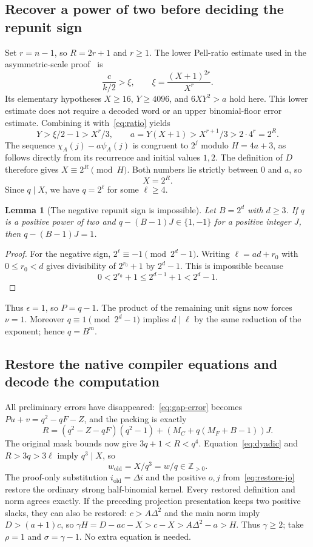 \documentclass[11pt]{article}
\newtheorem{lemma}[theorem]{Lemma}
\theoremstyle{definition}
\newcommand{\Pos}{\mathbb Z_{>0}}
\begin{document}
\subsection{Recover a power of two before deciding the repunit sign}

Set $r=n-1$, so $R=2r+1$ and $r\geq1$. The lower Pell-ratio estimate used
in the asymmetric-scale proof~\cite{Asymmetric} is
\[
 \frac{c}{k/2}>
 \xi,\qquad \xi=\frac{(X+1)^{2r}}{X^r}.
\]
Its elementary hypotheses $X\geq16$, $Y\geq4096$, and $6XY^2>a$ hold
here. This lower estimate does not require a decoded word or an upper
binomial-floor error estimate. Combining it with~\eqref{eq:ratio} yields
\[
 Y>\xi/2-1>X^r/3,
 \qquad a=Y(X+1)>X^{r+1}/3>2\cdot4^r=2^R.
\]
The sequence $\chi_A(j)-a\psi_A(j)$ is congruent to $2^j$ modulo
$H=4a+3$, as follows directly from its recurrence and initial values $1,2$.
The definition of $D$ therefore gives $X\equiv2^R\pmod H$.
Both numbers lie strictly between $0$ and $a$, so
\begin{equation}\label{eq:dyadic}
 X=2^R.
\end{equation}
Since $q\mid X$, we have $q=2^\ell$ for some $\ell\geq4$.

\begin{lemma}[The negative repunit sign is impossible]\label{lem:rep-sign}
Let $B=2^d$ with $d\geq3$. If $q$ is a positive power of two and
$q-(B-1)J\in\{1,-1\}$ for a positive integer $J$, then
$q-(B-1)J=1$.
\end{lemma}

\begin{proof}
For the negative sign, $2^\ell\equiv-1\pmod{2^d-1}$.
Writing $\ell=ad+r_0$ with $0\leq r_0<d$ gives divisibility of
$2^{r_0}+1$ by $2^d-1$. This is impossible because
\[
 0<2^{r_0}+1\leq2^{d-1}+1<2^d-1.
\]
\end{proof}

Thus $\epsilon=1$, so $P=q-1$. The product of the remaining unit signs
now forces $\nu=1$. Moreover $q\equiv1\pmod{2^d-1}$ implies $d\mid\ell$
by the same reduction of the exponent; hence $q=B^m$.

\subsection{Restore the native compiler equations and decode the computation}

All preliminary errors have disappeared:~\eqref{eq:gap-error} becomes
$Pu+v=q^2-qF-Z$, and the packing is exactly
\[
 R=(q^2-Z-qF)(q^2-1)+(M_C+q(M_F+B-1))J.
\]
The original mask bounds now give $3q+1<R<q^4$.
Equation~\eqref{eq:dyadic} and $R>3q>3\ell$ imply $q^3\mid X$, so
\[
 w_{\mathrm{old}}=X/q^3=w/q\in\Pos.
\]
The proof-only substitution $i_{\mathrm{old}}=\Delta i$ and the positive
$o,j$ from~\eqref{eq:restore-jo} restore the ordinary strong half-binomial
kernel. Every restored definition and norm agrees exactly. If the preceding
projection presentation keeps two positive slacks, they can also be restored:
$c>A\Delta^2$ and the main norm imply $D>(a+1)c$, so
$\gamma H=D-ac-X>c-X>A\Delta^2-a>H$.
Thus $\gamma\geq2$; take $\rho=1$ and
$\sigma=\gamma-1$. No extra equation is needed.
\end{document}
